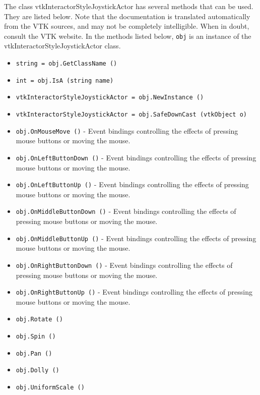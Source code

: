 The class vtkInteractorStyleJoystickActor has several methods that can be used.
  They are listed below.
Note that the documentation is translated automatically from the VTK sources,
and may not be completely intelligible.  When in doubt, consult the VTK website.
In the methods listed below, \verb|obj| is an instance of the vtkInteractorStyleJoystickActor class.
\begin{itemize}
\item  \verb|string = obj.GetClassName ()|

\item  \verb|int = obj.IsA (string name)|

\item  \verb|vtkInteractorStyleJoystickActor = obj.NewInstance ()|

\item  \verb|vtkInteractorStyleJoystickActor = obj.SafeDownCast (vtkObject o)|

\item  \verb|obj.OnMouseMove ()| -  Event bindings controlling the effects of pressing mouse buttons
 or moving the mouse.

\item  \verb|obj.OnLeftButtonDown ()| -  Event bindings controlling the effects of pressing mouse buttons
 or moving the mouse.

\item  \verb|obj.OnLeftButtonUp ()| -  Event bindings controlling the effects of pressing mouse buttons
 or moving the mouse.

\item  \verb|obj.OnMiddleButtonDown ()| -  Event bindings controlling the effects of pressing mouse buttons
 or moving the mouse.

\item  \verb|obj.OnMiddleButtonUp ()| -  Event bindings controlling the effects of pressing mouse buttons
 or moving the mouse.

\item  \verb|obj.OnRightButtonDown ()| -  Event bindings controlling the effects of pressing mouse buttons
 or moving the mouse.

\item  \verb|obj.OnRightButtonUp ()| -  Event bindings controlling the effects of pressing mouse buttons
 or moving the mouse.

\item  \verb|obj.Rotate ()|

\item  \verb|obj.Spin ()|

\item  \verb|obj.Pan ()|

\item  \verb|obj.Dolly ()|

\item  \verb|obj.UniformScale ()|

\end{itemize}
